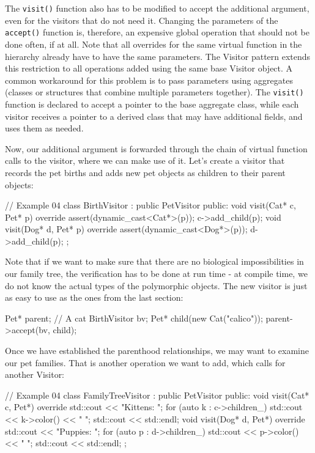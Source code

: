 The \texttt{visit()} function also has to be modified to accept the additional argument, even for the visitors that do not need it. Changing the parameters of the \texttt{accept()} function is, therefore, an expensive global operation that should not be done often, if at all. Note that all overrides for the same virtual function in the hierarchy already have to have the same parameters. The Visitor pattern extends this restriction to all operations added using the same base Visitor object. A common workaround for this problem is to pass parameters using aggregates (classes or structures that combine multiple parameters together). The \texttt{visit()} function is declared to accept a pointer to the base aggregate class, while each visitor receives a pointer to a derived class that may have additional fields, and uses them as needed.

Now, our additional argument is forwarded through the chain of virtual function calls to the visitor, where we can make use of it. Let's create a visitor that records the pet births and adds new pet objects as children to their parent objects:

\begin{code}
// Example 04
class BirthVisitor : public PetVisitor {
  public:
  void visit(Cat* c, Pet* p) override {
    assert(dynamic_cast<Cat*>(p));
    c->add_child(p);
  }
  void visit(Dog* d, Pet* p) override {
    assert(dynamic_cast<Dog*>(p));
    d->add_child(p);
  }
};
\end{code}

Note that if we want to make sure that there are no biological impossibilities in our family tree, the verification has to be done at run time - at compile time, we do not know the actual types of the polymorphic objects. The new visitor is just as easy to use as the ones from the last section:

\begin{code}
Pet* parent; // A cat
BirthVisitor bv;
Pet* child(new Cat("calico"));
parent->accept(bv, child);
\end{code}

Once we have established the parenthood relationships, we may want to examine our pet families. That is another operation we want to add, which calls for another Visitor:

\begin{code}
// Example 04
class FamilyTreeVisitor : public PetVisitor {
  public:
  void visit(Cat* c, Pet*) override {
    std::cout << "Kittens: ";
    for (auto k : c->children_) {
      std::cout << k->color() << " ";
    }
    std::cout << std::endl;
  }
  void visit(Dog* d, Pet*) override {
    std::cout << "Puppies: ";
    for (auto p : d->children_) {
      std::cout << p->color() << " ";
    }
    std::cout << std::endl;
  }
};
\end{code}

